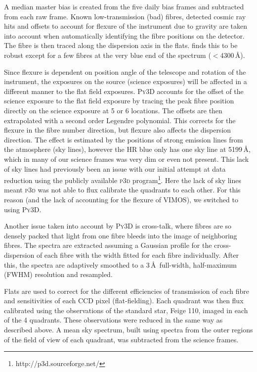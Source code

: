 		A median master bias is created from the five daily bias frames and subtracted from each raw frame. Known low-transmission (bad) fibres, detected cosmic ray hits and offsets to account for flexure of the instrument due to gravity are taken into account when automatically identifying the fibre positions on the detector. The fibre is then traced along the dispersion axis in the flats. \citet{Husemann2014} finds this to be robust except for a few fibres at the very blue end of the spectrum ($<4300$\,\AA). 

		Since flexure is dependent on position angle of the telescope and rotation of the instrument, the exposures on the source (science exposures) will be affected in a different manner to the flat field exposures. \textsc{Py3D} accounts for the offset of the science exposure to the flat field exposure by tracing the peak fibre position directly on the science exposure at 5 or 6 locations. The offsets are then extrapolated with a second order Legendre polynomial. This corrects for the flexure in the fibre number direction, but flexure also affects the dispersion direction. The effect is estimated by the positions of strong emission lines from the atmosphere (sky lines), however the HR blue only has one sky line at 5199\,\AA, which in many of our science frames was very dim or even not present. This lack of sky lines had previously been an issue with our initial attempt at data reduction using the publicly available \textsc{p3d} program\footnote{http://p3d.sourceforge.net/}. Here the lack of sky lines meant \textsc{p3d} was not able to flux calibrate the quadrants to each other. For this reason (and the lack of accounting for the flexure of VIMOS), we switched to using \textsc{Py3D}. 

		Another issue taken into account by \textsc{Py3D} is cross-talk, where fibres are so densely packed that light from one fibre bleeds into the image of neighboring fibres. The spectra are extracted assuming a Gaussian profile for the cross-dispersion of each fibre with the width fitted for each fibre individually. After this, the spectra are adaptively smoothed to a 3\,\AA\ full-width, half-maximum (FWHM) resolution and resampled.

		Flats are used to correct for the different efficiencies of transmission of each fibre and sensitivities of each CCD pixel (flat-fielding). Each quadrant was then flux calibrated using the observations of the standard star, Feige 110, imaged in each of the 4 quadrants. These observations were reduced in the same way as described above. A mean sky spectrum, built using spectra from the outer regions of the field of view of each quadrant, was subtracted from the science frames. 

